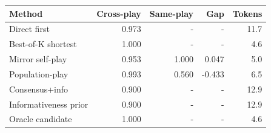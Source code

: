 \begin{tabular}{lrrrr}
\toprule
Method & Cross-play & Same-play & Gap & Tokens \\
\midrule
Direct first & 0.973 & - & - & 11.7 \\
Best-of-K shortest & 1.000 & - & - & 4.6 \\
Mirror self-play & 0.953 & 1.000 & 0.047 & 5.0 \\
Population-play & 0.993 & 0.560 & -0.433 & 6.5 \\
Consensus+info & 0.900 & - & - & 12.9 \\
Informativeness prior & 0.900 & - & - & 12.9 \\
Oracle candidate & 1.000 & - & - & 4.6 \\
\bottomrule
\end{tabular}
